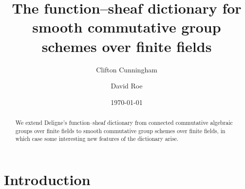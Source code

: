 \documentclass{amsart}
\title[The function--sheaf dictionary]{The function--sheaf dictionary for smooth commutative group schemes over finite fields}
\date{\today}
\author{Clifton Cunningham}
\author{David Roe}
\theoremstyle{plain}
\theoremstyle{definition}
\theoremstyle{remark}
\newcommand{\Fq}{k}
\begin{document}
\begin{abstract}
  We extend Deligne's function--sheaf dictionary from
  connected commutative algebraic groups over finite fields to smooth
  commutative group schemes over finite fields,
  in which case some interesting new features of the dictionary arise.
   \end{abstract}

\maketitle

\section*{Introduction}



%


\end{document}
